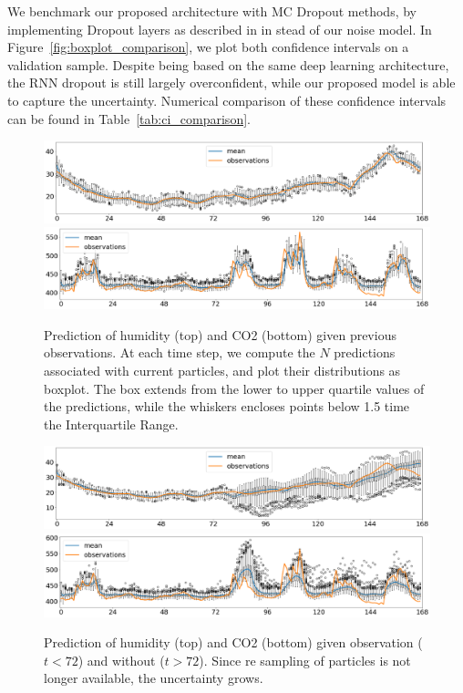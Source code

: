 \documentclass{article}
\begin{document}
We benchmark our proposed architecture with MC Dropout methods, by implementing Dropout layers as described in \cite{Gal2016NIPS} in stead of our noise model.
In Figure~\ref{fig:boxplot_comparison}, we plot both confidence intervals on a validation sample.
Despite being based on the same deep learning architecture, the RNN dropout is still largely overconfident, while our proposed model is able to capture the uncertainty.
Numerical comparison of these confidence intervals can be found in Table~\ref{tab:ci_comparison}.

\begin{figure}[htpb]
	\centering
	\includegraphics[width=\linewidth]{filter_kp1_hum.png}
	\includegraphics[width=\linewidth]{filter_kp1_co2.png}
	\caption{Prediction of humidity (top) and CO2 (bottom) given previous observations. At each time step, we compute the $N$ predictions associated with current particles, and plot their distributions as boxplot. The box extends from the lower to upper quartile values of the predictions, while the whiskers encloses points below 1.5 time the Interquartile Range.}%
	\label{fig:filter_k+1}
\end{figure}

\begin{figure}[htpb]
	\centering
	\includegraphics[width=\linewidth]{filter_kp24_hum.png}
	\includegraphics[width=\linewidth]{filter_kp24_co2.png}
	\caption{Prediction of humidity (top) and CO2 (bottom) given observation ($t<72$) and without ($t > 72$). Since re sampling of particles is not longer available, the uncertainty grows.}%
	\label{fig:filter_k+24}
\end{figure}
\end{document}
